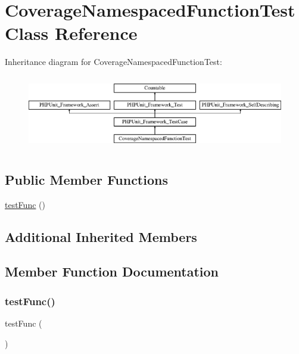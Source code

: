 \hypertarget{class_coverage_namespaced_function_test}{}\section{Coverage\+Namespaced\+Function\+Test Class Reference}
\label{class_coverage_namespaced_function_test}
Inheritance diagram for Coverage\+Namespaced\+Function\+Test\+:\begin{figure}[H]
\begin{center}
\leavevmode
\includegraphics[height=3.303835cm]{class_coverage_namespaced_function_test}
\end{center}
\end{figure}
\subsection*{Public Member Functions}
\begin{DoxyCompactItemize}
\item 
\mbox{\hyperlink{class_coverage_namespaced_function_test_a7a7bdea345010f011b62a11dc96e7e3e}{test\+Func}} ()
\end{DoxyCompactItemize}
\subsection*{Additional Inherited Members}


\subsection{Member Function Documentation}
\mbox{\label{class_coverage_namespaced_function_test_a7a7bdea345010f011b62a11dc96e7e3e}} 
\subsubsection{\texorpdfstring{test\+Func()}{testFunc()}}
{\footnotesize\ttfamily test\+Func (\begin{DoxyParamCaption}{ }\end{DoxyParamCaption})}

